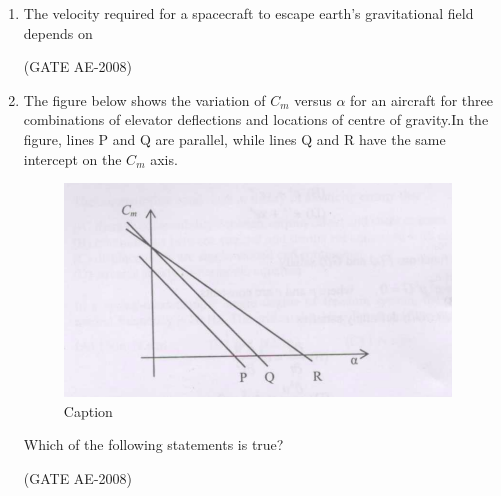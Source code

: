 \documentclass[journal,12pt,onecolumn]{IEEEtran}
\theoremstyle{remark}
\begin{document}
\begin{enumerate}
    \quad

    \item  The velocity required for a spacecraft to escape earth's gravitational field depends on
    \begin{enumerate}
    \end{enumerate}
    \hfill(GATE AE-2008)

    \quad

\item The figure below shows the variation of $C_m$ versus $\alpha$ for an aircraft for three combinations of elevator deflections and locations of centre of gravity.In the figure, lines P and Q are parallel, while lines Q and R have the same intercept on the $C_m$ axis.

\begin{figure}
    \centering
    \includegraphics[width=0.5\linewidth]{figs/Screenshot from 2025-08-08 00-10-35.png}
    \caption{Caption}
    \label{fig:placeholder}
\end{figure}
 Which of the following statements is true?
    \begin{enumerate}
    \end{enumerate}
    \hfill(GATE AE-2008)


\end{enumerate}
\end{document}
